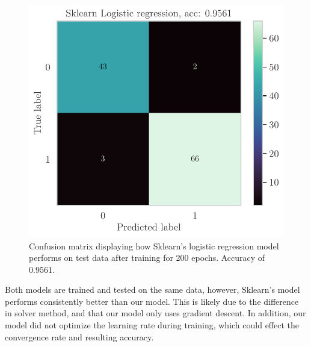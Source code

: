 \begin{figure}
    \centering
    \includegraphics[width=0.9\linewidth]{latex/figures/sklearn_logreg_confusion_matrix.pdf}
    \caption{Confusion matrix displaying how Sklearn's logistic regression model performs on test data after training for 200 epochs. Accuracy of 0.9561.}
    \label{fig:sklearns_log_confusion_matrix}
\end{figure}

Both models are trained and tested on the same data, however, Sklearn's model performs consistently better than our model. This is likely due to the difference in solver method, and that our model only uses gradient descent. In addition, our model did not optimize the learning rate during training, which could effect the convergence rate and resulting accuracy.

